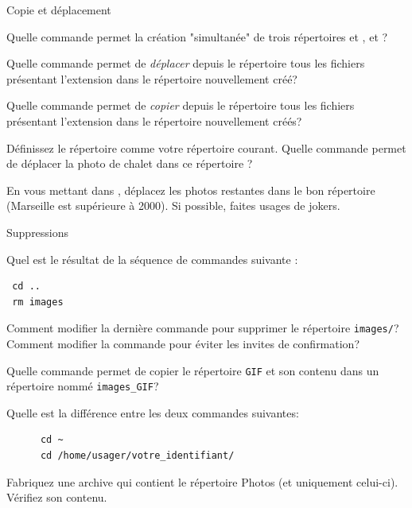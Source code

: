 \begin{exercice}
  \begin{exercicelet}{Copie et déplacement}
    \begin{questions}
    \item Quelle commande permet la création "simultanée" de trois
      répertoires  et ,
       et  ?
    \item Quelle commande permet de \emph{déplacer} depuis le répertoire
       tous les fichiers présentant l'extension
       dans le répertoire  nouvellement créé?
    \item Quelle commande permet de \emph{copier} depuis le répertoire
       tous les fichiers présentant l'extension
       dans le répertoire  nouvellement créés?
    \item Définissez le répertoire  comme votre répertoire
      courant. Quelle commande permet de déplacer la photo de chalet dans ce répertoire ?
    \item En vous mettant dans , déplacez les photos
      restantes dans le bon répertoire (Marseille est supérieure à
      2000). Si possible, faites usages de jokers.
    \end{questions}
  \end{exercicelet}
\end{exercice}
\begin{exercice}
  \begin{exercicelet}{Suppressions}
    \begin{questions}
    \item Quel est le résultat de la séquence de commandes suivante :
\begin{verbatim}
 cd ..
 rm images
\end{verbatim}
    \item Comment modifier la dernière commande pour supprimer le
      répertoire \texttt{images/}? Comment modifier la commande pour
      éviter les invites de confirmation?
    \item Quelle commande permet de copier le répertoire \texttt{GIF} et
      son contenu dans un répertoire nommé \verb|images_GIF|?
    \item Quelle est la différence entre les deux commandes suivantes:
\begin{verbatim}
      cd ~
      cd /home/usager/votre_identifiant/
\end{verbatim}
    \item Fabriquez une archive qui contient le répertoire Photos (et
      uniquement celui-ci). Vérifiez son contenu.
    \end{questions}
  \end{exercicelet}
\end{exercice}
